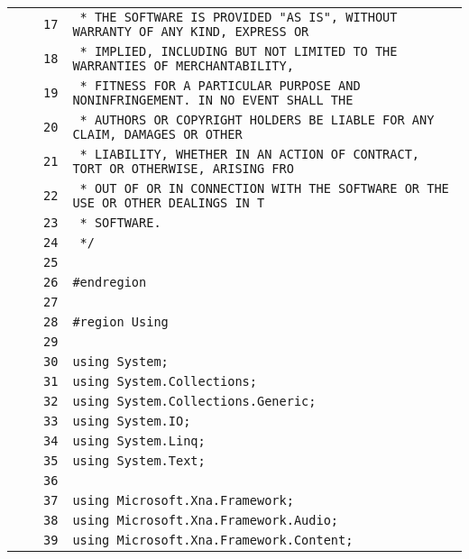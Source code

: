 \documentclass[a4paper,10pt]{article}
\begin{document}
\begin{longtable}[l]{lrrl}
\cellcolor{gray} &  & \verb~17~ & \verb~ * THE SOFTWARE IS PROVIDED "AS IS", WITHOUT WARRANTY OF ANY KIND, EXPRESS OR~\\
\cellcolor{gray} &  & \verb~18~ & \verb~ * IMPLIED, INCLUDING BUT NOT LIMITED TO THE WARRANTIES OF MERCHANTABILITY,~\\
\cellcolor{gray} &  & \verb~19~ & \verb~ * FITNESS FOR A PARTICULAR PURPOSE AND NONINFRINGEMENT. IN NO EVENT SHALL THE~\\
\cellcolor{gray} &  & \verb~20~ & \verb~ * AUTHORS OR COPYRIGHT HOLDERS BE LIABLE FOR ANY CLAIM, DAMAGES OR OTHER~\\
\cellcolor{gray} &  & \verb~21~ & \verb~ * LIABILITY, WHETHER IN AN ACTION OF CONTRACT, TORT OR OTHERWISE, ARISING FRO~\\
\cellcolor{gray} &  & \verb~22~ & \verb~ * OUT OF OR IN CONNECTION WITH THE SOFTWARE OR THE USE OR OTHER DEALINGS IN T~\\
\cellcolor{gray} &  & \verb~23~ & \verb~ * SOFTWARE.~\\
\cellcolor{gray} &  & \verb~24~ & \verb~ */~\\
\cellcolor{gray} &  & \verb~25~ & \verb~~\\
\cellcolor{gray} &  & \verb~26~ & \verb~#endregion~\\
\cellcolor{gray} &  & \verb~27~ & \verb~~\\
\cellcolor{gray} &  & \verb~28~ & \verb~#region Using~\\
\cellcolor{gray} &  & \verb~29~ & \verb~~\\
\cellcolor{gray} &  & \verb~30~ & \verb~using System;~\\
\cellcolor{gray} &  & \verb~31~ & \verb~using System.Collections;~\\
\cellcolor{gray} &  & \verb~32~ & \verb~using System.Collections.Generic;~\\
\cellcolor{gray} &  & \verb~33~ & \verb~using System.IO;~\\
\cellcolor{gray} &  & \verb~34~ & \verb~using System.Linq;~\\
\cellcolor{gray} &  & \verb~35~ & \verb~using System.Text;~\\
\cellcolor{gray} &  & \verb~36~ & \verb~~\\
\cellcolor{gray} &  & \verb~37~ & \verb~using Microsoft.Xna.Framework;~\\
\cellcolor{gray} &  & \verb~38~ & \verb~using Microsoft.Xna.Framework.Audio;~\\
\cellcolor{gray} &  & \verb~39~ & \verb~using Microsoft.Xna.Framework.Content;~\\

\end{longtable}
\end{document}
